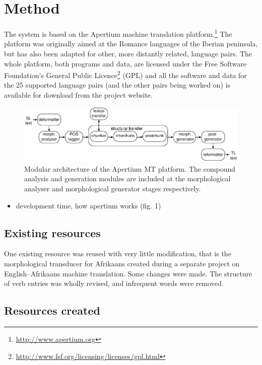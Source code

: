 \documentclass[11pt]{article}
\begin{document}
\section{Method}

The system is based on the Apertium machine translation platform.\footnote{\url{http://www.apertium.org}} The
platform was originally aimed at the Romance languages of the Iberian
peninsula, but has also been adapted for other, more distantly related,
language pairs. The whole platform, both programs and data, are licensed
under the Free Software Foundation's General Public
Licence\footnote{\url{http://www.fsf.org/licensing/licenses/gpl.html}} (GPL)
and all the software and data for the 25 supported language pairs (and the
other pairs being worked on) is available for download from the project
website.

\begin{figure}
  \centering
  \includegraphics[scale=0.8]{apertium2.pdf}
  \caption{Modular architecture of the Apertium MT
    platform. The compound analysis and generation modules are included at the morphological
    analyser and morphological generator stages respectively.}
\label{fg:apertium}
\end{figure}

\begin{itemize}
\item development time, how apertium works (fig. 1)
\end{itemize}

\subsection{Existing resources}

One existing resource was reused with very little modification, that is the 
morphological transducer for Afrikaans created during a separate project on English--Afrikaans
machine translation. Some changes were made. The structure of verb entries
was wholly revised, and infrequent words were removed.

\subsection{Resources created}
\end{document}

